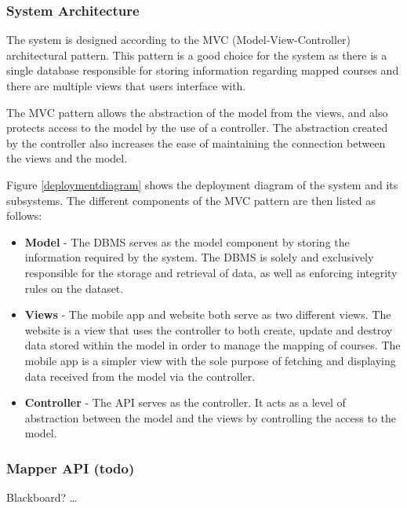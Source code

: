 \documentclass{article}
\begin{document}
    \subsubsection{System Architecture}
    
    The system is designed according to the MVC (Model-View-Controller)
    architectural pattern. This pattern is a good choice for the system as
    there is a single database responsible for storing information regarding
    mapped courses and there are multiple views that users interface with.
    
    The MVC pattern allows the abstraction of the model from the views, and
    also protects access to the model by the use of a controller. The
    abstraction created by the controller also increases the ease of
    maintaining the connection between the views and the model.

    Figure \ref{deploymentdiagram} shows the deployment diagram of the system
    and its subsystems. The different components of the MVC pattern are then
    listed as follows:

    \begin{itemize}
        \item \textbf{Model} - The DBMS serves as the model component by
            storing the information required by the system. The DBMS is solely
            and exclusively responsible for the storage and retrieval of data,
            as well as enforcing integrity rules on the dataset.
        \item \textbf{Views} - The mobile app and website both serve as two
            different views. The website is a view that uses the controller to
            both create, update and destroy data stored within the model in
            order to manage the mapping of courses. The mobile app is a simpler
            view with the sole purpose of fetching and displaying data received
            from the model via the controller.
        \item \textbf{Controller} - The API serves as the controller. It acts
            as a level of abstraction between the model and the views by
            controlling the access to the model.
    \end{itemize}

    \subsubsection{Mapper API (todo)}

    Blackboard? \ldots
\end{document}
